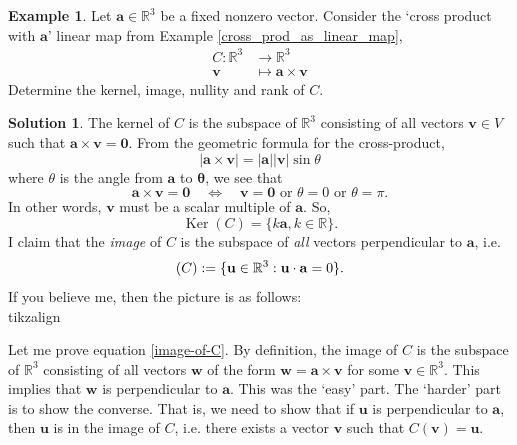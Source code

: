 \documentclass[a4paper,11pt]{book}
\theoremstyle{definition}
\newtheorem{example_environment}{Example}[chapter]
\newtheorem*{solution}{Solution}
\newcommand{\ve}[1]{\mathbf{#1}}
\newenvironment{example}
	{
		\begin{oframed} 
		\begin{example_environment}
	}
	{
		\end{example_environment}
		\end{oframed}
	}
\DeclareMathOperator{\Ker}{Ker}
\let\Im\relax
\DeclareMathOperator{\Im}{Im} %
\begin{document}
\begin{example} \label{cross-product-example} Let $\ve{a} \in \mathbb{R}^3$ be a fixed nonzero vector. Consider the `cross product with $\ve{a}$' linear map from Example \ref{cross_prod_as_linear_map},
\begin{align*}
 C : \mathbb{R}^3 & \rightarrow \mathbb{R}^3  \\
   \ve{v} &\mapsto \ve{a} \times \ve{v}
\end{align*}
Determine the kernel, image, nullity and rank of $C$.
\begin{solution} The kernel of $C$ is the subspace of $\mathbb{R}^3$ consisting of all vectors $\ve{v} \in V$ such that $\ve{a} \times \ve{v} = \ve{0}$. From the geometric formula for the cross-product,
\[
 |\ve{a} \times \ve{v}| = |\ve{a}| |\ve{v}| \sin \theta
\]
where $\theta$ is the angle from $\ve{a}$ to $\ve{\theta}$, we see that
\[
\ve{a} \times \ve{v} = \ve{0} \quad \Leftrightarrow \quad \mbox{$\ve{v}=\ve{0}$ or $\theta = 0$ or $\theta= \pi$}.
\]
In other words, $\ve{v}$ must be a scalar multiple of $\ve{a}$. So,
\[
 \Ker(C) = \{ k \ve{a}, k \in \mathbb{R} \}.
\]  
I claim that the {\em image} of $C$ is the subspace of {\em all} vectors perpendicular to $\ve{a}$, i.e.
\begin{equation} \label{image-of-C} 
 \Im(C) := \{ \ve{u} \in \mathbb{R}^3 : \ve{u} \cdot \ve{a} = 0 \}.
\end{equation}
If you believe me, then the picture is as follows:\\
tikzalign
\begin{center}
\end{center}

Let me prove equation \eqref{image-of-C}. By definition, the image of $C$ is the subspace of $\mathbb{R}^3$ consisting of all vectors $\ve{w}$ of the form $\ve{w} = \ve{a} \times \ve{v}$ for some $\ve{v} \in \mathbb{R}^3$. This implies that $\ve{w}$ is perpendicular to $\ve{a}$. This was the `easy' part. The `harder' part is to show the converse. That is, we need to show that if $\ve{u}$ is perpendicular to $\ve{a}$, then $\ve{u}$ is in the image of $C$, i.e. there exists a vector $\ve{v}$ such that $C(\ve{v}) = \ve{u}$.


\end{solution}
\end{example}
\end{document}
